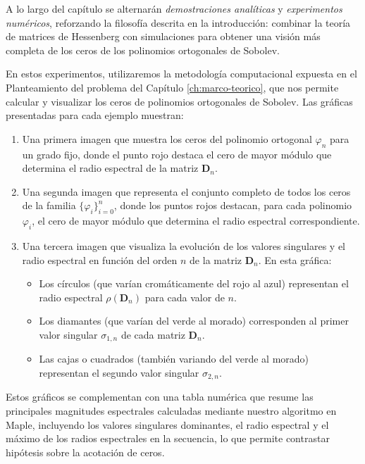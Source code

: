 A lo largo del capítulo se alternarán \emph{demostraciones analíticas} y \emph{experimentos numéricos}, reforzando la filosofía descrita en la introducción: combinar la teoría de matrices de Hessenberg con simulaciones para obtener una visión más completa de los ceros de los polinomios ortogonales de Sobolev.

En estos experimentos, utilizaremos la metodología computacional expuesta en el Planteamiento del problema del Capítulo \ref{ch:marco-teorico}, que nos permite calcular y visualizar los ceros de polinomios ortogonales de Sobolev. Las gráficas presentadas para cada ejemplo muestran:

\begin{enumerate}
  \item Una primera imagen que muestra los ceros del polinomio ortogonal $\varphi_n$ para un grado fijo, donde el punto rojo destaca el cero de mayor módulo que determina el radio espectral de la matriz $\mathbf{D}_n$.

  \item Una segunda imagen que representa el conjunto completo de todos los ceros de la familia $\{\varphi_i\}_{i=0}^n$, donde los puntos rojos destacan, para cada polinomio $\varphi_i$, el cero de mayor módulo que determina el radio espectral correspondiente.

  \item Una tercera imagen que visualiza la evolución de los valores singulares y el radio espectral en función del orden $n$ de la matriz $\mathbf{D}_n$. En esta gráfica:
        \begin{itemize}
          \item Los círculos (que varían cromáticamente del rojo al azul) representan el radio espectral $\rho(\mathbf{D}_n)$ para cada valor de $n$.
          \item Los diamantes (que varían del verde al morado) corresponden al primer valor singular $\sigma_{1,n}$ de cada matriz $\mathbf{D}_n$.
          \item Las cajas o cuadrados (también variando del verde al morado) representan el segundo valor singular $\sigma_{2,n}$.
        \end{itemize}
\end{enumerate}

Estos gráficos se complementan con una tabla numérica que resume las principales magnitudes espectrales calculadas mediante nuestro algoritmo en Maple, incluyendo los valores singulares dominantes, el radio espectral y el máximo de los radios espectrales en la secuencia, lo que permite contrastar hipótesis sobre la acotación de ceros.

